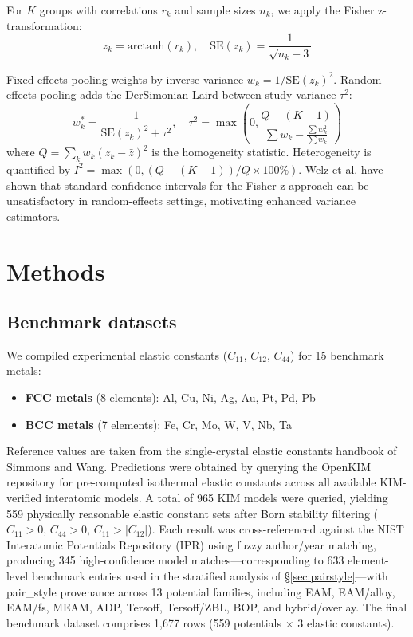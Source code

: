\documentclass[twocolumn,10pt]{article}
\begin{document}
For $K$ groups with correlations $r_k$ and sample sizes $n_k$, we apply the Fisher z-transformation:
\begin{equation}
z_k = \text{arctanh}(r_k), \quad \text{SE}(z_k) = \frac{1}{\sqrt{n_k - 3}}
\end{equation}

Fixed-effects pooling weights by inverse variance $w_k = 1/\text{SE}(z_k)^2$. Random-effects pooling adds the DerSimonian-Laird between-study variance $\tau^2$:
\begin{equation}
w_k^* = \frac{1}{\text{SE}(z_k)^2 + \tau^2}, \quad \tau^2 = \max\left(0, \frac{Q - (K-1)}{\sum w_k - \frac{\sum w_k^2}{\sum w_k}}\right)
\end{equation}
where $Q = \sum_k w_k (z_k - \bar{z})^2$ is the homogeneity statistic. Heterogeneity is quantified by $I^2 = \max(0, (Q - (K-1))/Q \times 100\%)$\cite{higgins2003}. Welz et al.\cite{welz2022} have shown that standard confidence intervals for the Fisher z approach can be unsatisfactory in random-effects settings, motivating enhanced variance estimators.

\section{Methods}

\subsection{Benchmark datasets}

We compiled experimental elastic constants ($C_{11}$, $C_{12}$, $C_{44}$) for 15 benchmark metals:
\begin{itemize}
\item \textbf{FCC metals} (8 elements): Al, Cu, Ni, Ag, Au, Pt, Pd, Pb
\item \textbf{BCC metals} (7 elements): Fe, Cr, Mo, W, V, Nb, Ta
\end{itemize}
Reference values are taken from the single-crystal elastic constants handbook of Simmons and Wang\cite{simmons1971}. Predictions were obtained by querying the OpenKIM repository\cite{openkim} for pre-computed isothermal elastic constants across all available KIM-verified interatomic models. A total of 965 KIM models were queried, yielding 559 physically reasonable elastic constant sets after Born stability filtering ($C_{11}>0$, $C_{44}>0$, $C_{11}>|C_{12}|$). Each result was cross-referenced against the NIST Interatomic Potentials Repository (IPR)\cite{nist_ipr} using fuzzy author/year matching, producing 345 high-confidence model matches---corresponding to 633 element-level benchmark entries used in the stratified analysis of \S\ref{sec:pairstyle}---with pair\_style provenance across 13 potential families, including EAM, EAM/alloy, EAM/fs, MEAM, ADP, Tersoff, Tersoff/ZBL, BOP, and hybrid/overlay. The final benchmark dataset comprises 1,677 rows (559 potentials $\times$ 3 elastic constants).
\end{document}
